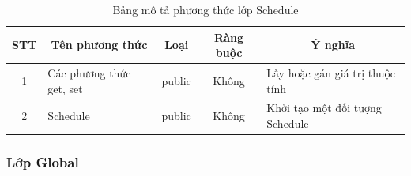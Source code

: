 \documentclass[a4paper, 12pt]{article}
\begin{document}
\begin{table}[H]
	\begin{center}
		\begin{tabular}{|c|l|c|c|l|}
			\hline
			STT & \multicolumn{1}{c|}{Tên phương thức} & Loại                        & \multicolumn{1}{c|}{Ràng buộc} & \multicolumn{1}{c|}{Ý nghĩa}    \\ \hline
			1   & Các phương thức get, set             & public                      &                   Không             & Lấy hoặc gán giá trị thuộc tính \\ \hline
			2   & Schedule                             & \multicolumn{1}{l|}{public} &                       Không         & Khởi tạo một đối tượng Schedule \\ \hline
		\end{tabular}
		\caption{Bảng mô tả phương thức lớp Schedule}
	\end {center}
\end{table}

\subsubsection{Lớp Global}
\end{document}
